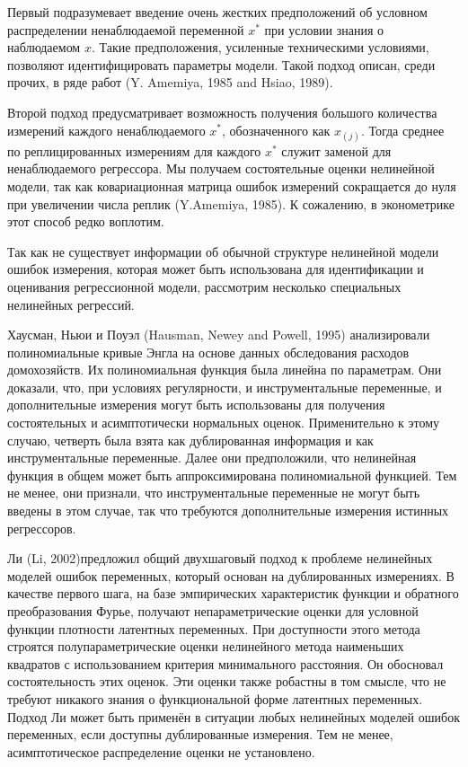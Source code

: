 Первый подразумевает введение очень жестких предположений об условном распределении ненаблюдаемой переменной $x^*$ при условии знания о наблюдаемом $x$. Такие предположения, усиленные техническими условиями, позволяют идентифицировать параметры модели. Такой подход описан, среди прочих, в ряде работ (Y. Amemiya, 1985 and Hsiao, 1989).

Второй подход предусматривает возможность получения большого количества измерений каждого ненаблюдаемого $x^*$, обозначенного как $x_{(j)}$. Тогда среднее по реплицированных измерениям для каждого $x^*$ служит заменой для ненаблюдаемого регрессора. Мы получаем состоятельные оценки нелинейной модели, так как ковариационная матрица ошибок измерений сокращается до нуля при увеличении числа реплик (Y.Amemiya, 1985). К сожалению, в эконометрике этот способ редко воплотим.

Так как не существует информации об обычной структуре нелинейной модели ошибок измерения, которая может быть использована для идентификации и оценивания регрессионной модели, рассмотрим несколько специальных нелинейных регрессий.

Хаусман, Ньюи и Поуэл (Hausman, Newey and Powell, 1995) анализировали полиномиальные кривые Энгла на основе данных обследования расходов домохозяйств. Их полиномиальная функция была линейна по параметрам. Они доказали, что, при условиях регулярности, и инструментальные переменные, и дополнительные измерения могут быть использованы для получения состоятельных и асимптотически нормальных оценок. Применительно к этому случаю, четверть была взята как дублированная информация и как инструментальные переменные. Далее они предположили, что нелинейная функция в общем может быть аппроксимирована полиномиальной функцией. Тем не менее, они признали, что инструментальные переменные не могут быть введены в этом случае, так что требуются дополнительные измерения истинных регрессоров.

Ли (Li, 2002)предложил общий двухшаговый подход к проблеме нелинейных моделей ошибок переменных, который основан на дублированных измерениях. В качестве первого шага, на базе эмпирических характеристик функции и обратного преобразования Фурье, получают непараметрические оценки для условной функции плотности латентных переменных. При доступности этого метода строятся полупараметрические оценки нелинейного метода наименьших квадратов с использованием критерия минимального расстояния. Он обосновал состоятельность этих оценок. Эти оценки также робастны в том смысле, что не требуют никакого знания о функциональной форме латентных переменных. Подход Ли может быть применён в ситуации любых нелинейных моделей ошибок переменных, если доступны дублированные измерения. Тем не менее, асимптотическое распределение оценки не установлено.

